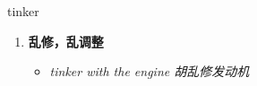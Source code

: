 
\begin{frame}
{\huge tinker}
\begin{center}
\begin{enumerate}\Large
  \item \textbf{乱修，乱调整}
  \begin{itemize}
    \item \em{\Large{tinker with the engine 胡乱修发动机}}
  \end{itemize}
\end{enumerate}
\end{center}
\end{frame}
